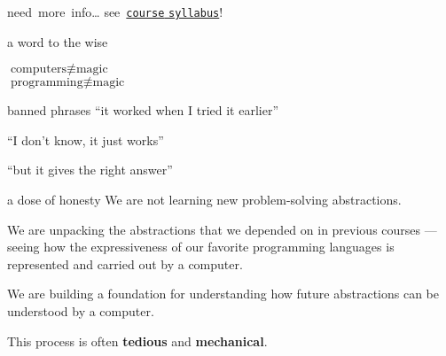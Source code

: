 \documentclass[10pt,t,usenames,dvipsnames]{beamer}
\begin{document}
  \begin{frame}[standout]{\mbox{need more info\dots}}
    \ifnotes
    \fi
    see~\href{https://csbsju.instructure.com/courses/11790/assignments/syllabus}{\nolinkurl{course} \nolinkurl{syllabus}}!
  \end{frame}

  \begin{frame}{a word to the wise}
    \begin{center} 
      \Large 
      $\mbox{computers}\not\equiv\mbox{magic}$\\
      $\mbox{programming}\not\equiv\mbox{magic}$\\[1\baselineskip]
    \end{center}

    \pause

    \begin{alertblock}{banned phrases}
      ``it worked when I tried it earlier''

      ``I don't know, it just works''

      ``but it gives the right answer''
    \end{alertblock}

  \end{frame}

  \begin{frame}{a dose of honesty}
    We are not learning new problem-solving abstractions.

    \pause

    We are unpacking the abstractions that we depended on in previous courses
    --- seeing how the expressiveness of our favorite programming languages is
    represented and carried out by a computer.

    We are building a foundation for understanding how future abstractions can
    be understood by a computer.

    \pause

    This process is often \textbf{\color{orange}tedious} and
    \textbf{\color{orange}mechanical}.

  \end{frame}
\end{document}
